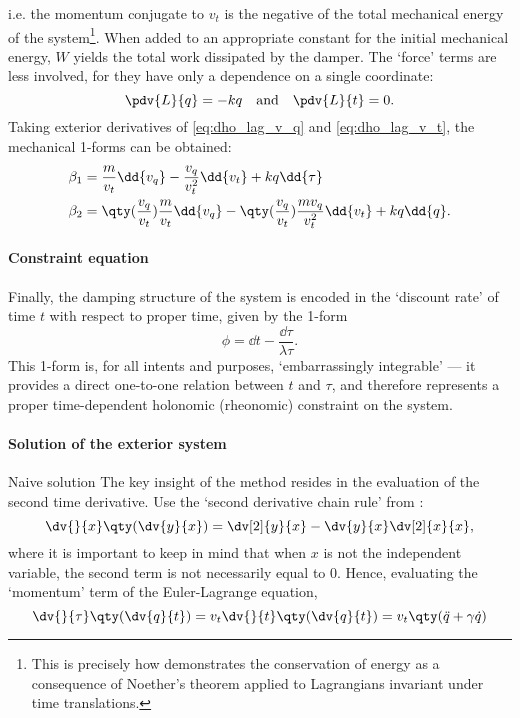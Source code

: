     i.e. the momentum conjugate to $v_t$ is the negative of the total mechanical energy of the system\footnote{This is precisely how \citet{Arnold1989} demonstrates the conservation of energy as a consequence of Noether's theorem applied to Lagrangians invariant under time translations.}. When added to an appropriate constant for the initial mechanical energy, $W$ yields the total work dissipated by the damper. The `force' terms are less involved, for they have only a dependence on a single coordinate:
    \begin{equation}
        \pdv{L}{q} = -kq \quad\text{and}\quad \pdv{L}{t} = 0. 
        \label{eq:dho_lag_force}
    \end{equation}
    Taking exterior derivatives of \cref{eq:dho_lag_v_q} and \cref{eq:dho_lag_v_t}, the mechanical 1-forms can be obtained:
    \begin{equation}
        \begin{split}
            \beta_1 &= \frac{m}{v_t}\dd{v_q} - \frac{v_q}{v_t^2}\dd{v_t} + kq\dd{\tau} \\
            \beta_2 &= \qty(\frac{v_q}{v_t})\frac{m}{v_t}\dd{v_q} - \qty(\frac{v_q}{v_t})\frac{m v_q}{v_t^2}\dd{v_t} + kq\dd{q}.
        \end{split}
    \end{equation}

\paragraph{Constraint equation}
Finally, the damping structure of the system is encoded in the `discount rate' of time $t$ with respect to proper time, given by the 1-form
    \begin{equation}
        \phi = \dd{t} - \frac{\dd{\tau}}{\lambda \tau}.
    \end{equation}
This 1-form is, for all intents and purposes, `embarrassingly integrable' --- it provides a direct one-to-one relation between $t$ and $\tau$, and therefore represents a proper time-dependent holonomic (rheonomic) constraint on the system.

\paragraph{Solution of the exterior system}

\begin{aside}{Naive solution}
    The key insight of the method resides in the evaluation of the second time derivative. Use the `second derivative chain rule' from \citet{Bartlett2019}:
    $$ \dv{}{x}\qty(\dv{y}{x}) = \dv[2]{y}{x} - \dv{y}{x}\dv[2]{x}{x}, $$
    where it is important to keep in mind that when $x$ is not the independent variable, the second term is not necessarily equal to 0.
    Hence, evaluating the `momentum' term of the Euler-Lagrange equation,
    $$ \dv{}{\tau}\qty(\dv{q}{t}) = v_t \dv{}{t}\qty(\dv{q}{t}) = v_t\qty(\ddot{q} + \gamma \dot{q}) $$

\end{aside}

